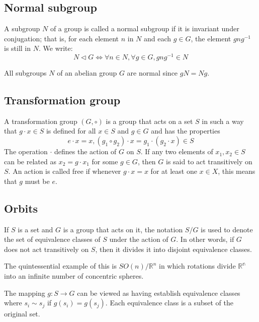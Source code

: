 \begin{refsection}
\subsection{Normal subgroup}
\begin{definition}
A subgroup $N$ of a group is called a normal subgroup if it is invariant under conjugation; that is, for each element $n$ in $N$ and each $g \in G$, the element $gng^{-1}$ is still in $N$. We write:
$$N \triangleleft G \Leftrightarrow \forall n \in N, \forall g \in G, gng^{-1} \in N$$	
\end{definition}

\begin{remark}
All subgroups $N$ of an abelian group $G$ are normal since $gN=Ng$.	
\end{remark}


\subsection{Transformation group}
A transformation group $(G,\circ)$ is a group that acts on a set $S$ in such a way that $g\cdot x \in S$ is defined for all $x \in S$ and $g \in G$ and has the properties
$$e\cdot x =x , (g_1 \circ g_2)\cdot x = g_1 \cdot (g_2 \cdot x) \in S$$ The operation $\cdot$ defines the action of $G$ on $S$.
If any two elements of $x_1,x_2 \in S$ can be related as $x_2 = g \cdot x_1$ for some $g\in G$, then $G$ is said to act transitively on $S$. An action is called free if whenever $g\cdot x =x$ for at least one $x \in X$, this means that $g$ must be $e$.

\subsection{Orbits}
\begin{definition}
If $S$ is a set and $G$ is a group that acts on it, the notation $S/G$ is used to denote the set of equivalence classes of $S$ under the action of $G$. In other words, if $G$ does not act transitively on $S$, then it divides it into disjoint equivalence classes.	
\end{definition}


\begin{remark}
The quintessential example of this is $SO(n)/\mathbb{R}^n$ in which rotations divide $\mathbb{R^n}$ into an infinite number of concentric spheres.	
\end{remark}

\begin{remark}
The mapping $g:S\rightarrow G$ can be viewed as having establish equivalence classes where $s_i \sim s_j $ if $g(s_i) = g(s_j)$. Each equivalence class is a subset of the original set. 	
\end{remark}







\end{refsection}
